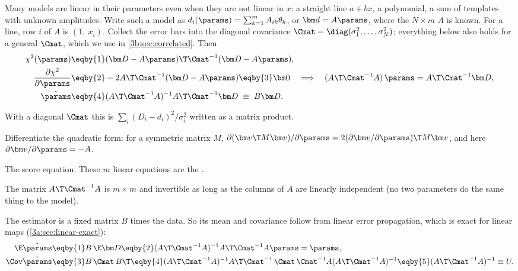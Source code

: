 Many models are linear in their parameters even when they are not linear
in $x$: a straight line $a+bx$, a polynomial, a sum of templates with
unknown amplitudes. Write such a model as
$d_i(\params)=\sum_{k=1}^mA_{ik}\theta_k$, or $\bm d=A\params$, where the
$N\times m$  $A$  is known. For a line,
row $i$ of $A$ is $(1,\ x_i)$. Collect the error bars into the diagonal
covariance $\Cmat=\diag(\sigma_1^2,\dots,\sigma_N^2)$; everything below also
holds for a general $\Cmat$, which we use in \cref{3b:sec:correlated}. Then
\begin{align}
  \chi^2(\params)&\eqby{1}(\bm D-A\params)\T\Cmat^{-1}(\bm D-A\params),
  \nonumber\\
  \frac{\partial\chi^2}{\partial\params}&\eqby{2}-2A\T\Cmat^{-1}(\bm D-A\params)
  \eqby{3}\bm0
  \quad\Longrightarrow\quad
  (A\T\Cmat^{-1}A)\,\hat\params=A\T\Cmat^{-1}\bm D,
  \nonumber\\
  \hat\params&\eqby{4}(A\T\Cmat^{-1}A)^{-1}A\T\Cmat^{-1}\bm D
  \;\equiv\;B\bm D .
  \label{3b:eq:normal-eq}
\end{align}
\begin{explain}
  \item With a diagonal $\Cmat$ this is
        $\sum_i(D_i-d_i)^2/\sigma_i^2$ written as a matrix product.
  \item Differentiate the quadratic form: for a symmetric matrix $M$,
        $\partial(\bm v\T M\bm v)/\partial\params=2(\partial\bm v/\partial\params)\T M\bm v$,
        and here $\partial\bm v/\partial\params=-A$.
  \item The score equation. These $m$ linear equations are the
        .
  \item The matrix $A\T\Cmat^{-1}A$ is $m\times m$ and invertible as long as
        the columns of $A$ are linearly independent (no two parameters do the
        same thing to the model).
\end{explain}
The estimator is a fixed matrix $B$ times the data. So its mean and
covariance follow from linear error propagation, which is exact for linear
maps (\cref{3a:sec:linear-exact}):
\begin{align}
  \E\hat\params&\eqby{1}B\,\E\bm D\eqby{2}(A\T\Cmat^{-1}A)^{-1}A\T\Cmat^{-1}A\params=\params,
  \nonumber\\
  \Cov\hat\params&\eqby{3}B\,\Cmat\,B\T
  \eqby{4}(A\T\Cmat^{-1}A)^{-1}A\T\Cmat^{-1}\,\Cmat\,\Cmat^{-1}A(A\T\Cmat^{-1}A)^{-1}
  \eqby{5}(A\T\Cmat^{-1}A)^{-1}\equiv U .
  \label{3b:eq:ls-cov}
\end{align}
